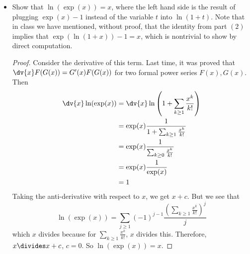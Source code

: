\documentclass{article}
\begin{document}
\begin{itemize}
        \item Show that $\ln(\exp(x)) = x$, where the left hand side is the result of plugging $\exp(x) - 1$ instead of the variable $t$ into $\ln(1 + t)$. Note that in class we have mentioned, without proof, that the identity from part $(2)$ implies that $\exp(\ln(1 + x)) - 1 = x$, which is nontrivial to show by direct computation.
            \begin{proof}
                Consider the derivative of this term. Last time, it was proved that $\dv{x}F(G(x)) = G^{\prime}(x)F(G(x))$ for two formal power series $F(x), G(x)$. Then
                    \begin{align*}
                        \dv{x}\ln(\exp(x)) &= \dv{x}\ln\left(1 + \sum_{k \geq 1}\dfrac{x^{k}}{k!}\right) \\ 
                                           &= \exp(x)\dfrac{1}{1 + \sum_{k \geq 1}\frac{x^{k}}{k!}} \\
                                           &= \exp(x)\dfrac{1}{\sum_{k \geq 0}\frac{x^{k}}{k!}} \\
                                           &= \exp(x)\dfrac{1}{\exp(x)} \\
                                           &= 1
                    \end{align*}
                Taking the anti-derivative with respect to $x$, we get $x + c$. But we see that
                    \begin{equation*}
                        \ln(\exp(x)) = \sum_{j \geq 1}(-1)^{j - 1}\dfrac{\left(\sum_{k \geq 1}\frac{x^{k}}{k!}\right)^{j}}{j}
                    \end{equation*}
                which $x$ divides because for $\sum_{k \geq 1}\frac{x^{k}}{k!}$, $x$ divides this. Therefore, $x \divides x + c$, $c = 0$. So $\ln(\exp(x)) = x$.
            \end{proof}
    \end{itemize}
\end{document}
